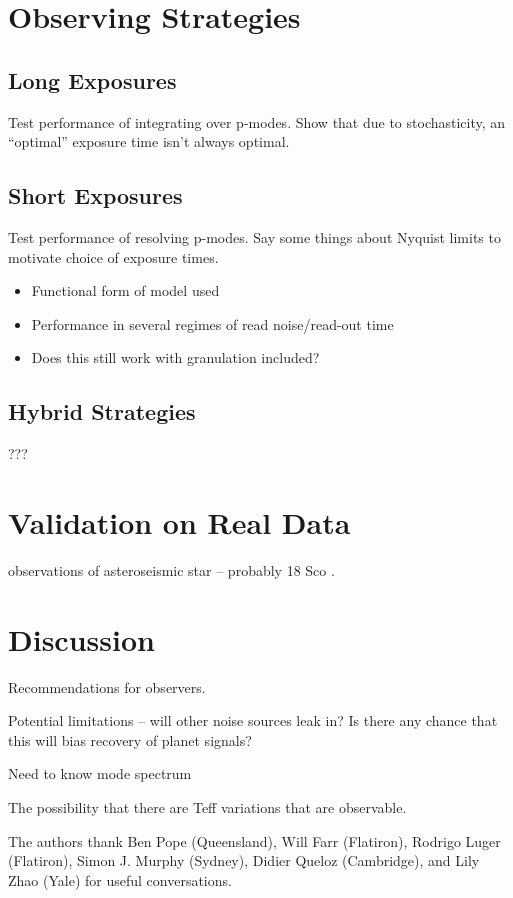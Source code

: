 \documentclass[modern]{aastex62}
\begin{document}
\section{Observing Strategies}

\subsection{Long Exposures}

Test performance of integrating over p-modes. Show that due to stochasticity, an ``optimal'' exposure time isn't always optimal.

\subsection{Short Exposures}

Test performance of resolving p-modes. Say some things about Nyquist limits to motivate choice of exposure times.

\begin{itemize}
\item Functional form of model used
\item Performance in several regimes of read noise/read-out time
\item Does this still work with granulation included?
\end{itemize}

\subsection{Hybrid Strategies}

???

\section{Validation on Real Data}

\HARPS observations of asteroseismic star -- probably 18 Sco \citep{Bazot2012}.

\section{Discussion}

Recommendations for observers.

Potential limitations -- will other noise sources leak in? Is there any chance that this will bias recovery of planet signals?

Need to know mode spectrum

The possibility that there are Teff variations that are observable.

\acknowledgements

The authors thank
  Ben Pope (Queensland),
  Will Farr (Flatiron),
  Rodrigo Luger (Flatiron),
  Simon J. Murphy (Sydney),
  Didier Queloz (Cambridge), and
  Lily Zhao (Yale)
for useful conversations.



\clearpage


\end{document}
